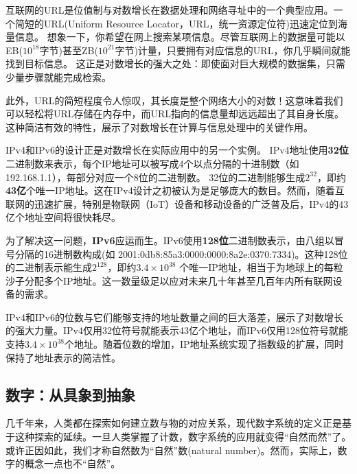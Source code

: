 互联网的URL是位值制与对数增长在数据处理和网络寻址中的一个典型应用。一个简短的URL(Uniform Resource Locator，URL，统一资源定位符)迅速定位到海量信息。
想象一下，你希望在网上搜索某项信息。尽管互联网上的数据量可能以EB($10^{18}$字节)甚至ZB($10^{21}$字节)计量，只要拥有对应信息的URL，你几乎瞬间就能找到目标信息。
这正是对数增长的强大之处：即使面对巨大规模的数据集，只需少量步骤就能完成检索。

此外，URL的简短程度令人惊叹，其长度是整个网络大小的对数！这意味着我们可以轻松将URL存储在内存中，而URL指向的信息量却远远超出了其自身长度。
这种简洁有效的特性，展示了对数增长在计算与信息处理中的关键作用。

IPv4和IPv6的设计正是对数增长在实际应用中的另一个实例。
 IPv4地址使用{\bf 32位}二进制数来表示，每个IP地址可以被写成4个以点分隔的十进制数（如192.168.1.1），每部分对应一个8位的二进制数。
32位的二进制能够生成$2^{32}$，即约{\bf 43亿}个唯一IP地址。这在IPv4设计之初被认为是足够庞大的数目。然而，随着互联网的迅速扩展，特别是物联网（IoT）设备和移动设备的广泛普及后，IPv4的43亿个地址空间将很快耗尽。

   为了解决这一问题，{\bf IPv6}应运而生。IPv6使用{\bf 128位}二进制数表示，由八组以冒号分隔的16进制数构成(如 2001:0db8:85a3:0000:0000:8a2e:0370:7334)。这种128位的二进制表示能生成$2^{128}$，即约{\bf $3.4 \times 10^{38} $} 个唯一IP地址，相当于为地球上的每粒沙子分配多个IP地址。这一数量级足以应对未来几十年甚至几百年内所有联网设备的需求。
   
IPv4和IPv6的位数与它们能够支持的地址数量之间的巨大落差，展示了对数增长的强大力量。IPv4仅用32位符号就能表示43亿个地址，而IPv6仅用128位符号就能支持{\bf $3.4 \times 10^{38}$}个地址。随着位数的增加，IP地址系统实现了指数级的扩展，同时保持了地址表示的简洁性。


\subsection{数字：从具象到抽象}
几千年来，人类都在探索如何建立数与物的对应关系，现代数字系统的定义正是基于这种探索的延续。一旦人类掌握了计数，数字系统的应用就变得“自然而然”了。或许正因如此，我们才称自然数为“自然”数(natural number)。然而，实际上，数字的概念一点也不“自然”。

